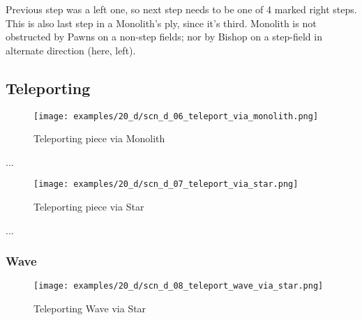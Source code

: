 Previous step was a left one, so next step needs to be one of 4 marked right
steps. This is also last step in a Monolith's ply, since it's third. Monolith
is not obstructed by Pawns on a non-step fields; nor by Bishop on a step-field
in alternate direction (here, left).

\clearpage %

\subsection*{Teleporting}

\noindent
\begin{figure}[!h]
\texttt{[image: examples/20\_d/scn\_d\_06\_teleport\_via\_monolith.png]}
\caption{Teleporting piece via Monolith}
\label{fig:scn_d_06_teleport_via_monolith}
\end{figure}

...

\clearpage %

\noindent
\begin{figure}[!h]
\texttt{[image: examples/20\_d/scn\_d\_07\_teleport\_via\_star.png]}
\caption{Teleporting piece via Star}
\label{fig:scn_d_07_teleport_via_star}
\end{figure}

...

\clearpage %

\subsubsection*{Wave}

\noindent
\begin{figure}[!h]
\texttt{[image: examples/20\_d/scn\_d\_08\_teleport\_wave\_via\_star.png]}
\caption{Teleporting Wave via Star}
\label{fig:scn_d_08_teleport_wave_via_star}
\end{figure}

